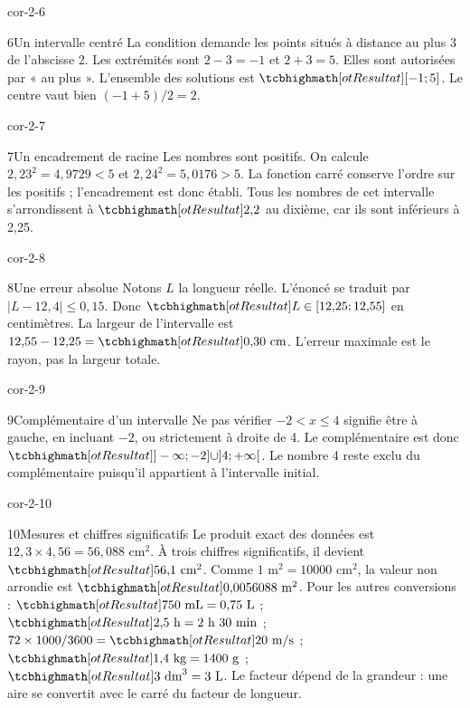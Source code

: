 \begin{blocLivre}{cor-2-6}
\begin{corrige}{6}{Un intervalle centré}
La condition demande les points situés à distance au plus 3 de l’abscisse 2. Les extrémités sont $2-3=-1$ et $2+3=5$. Elles sont autorisées par « au plus ». L’ensemble des solutions est $\res{[-1;5]}$. Le centre vaut bien $(-1+5)/2=2$.
\label{fig-cor-2-6}
\end{corrige}
\end{blocLivre}
\begin{blocLivre}{cor-2-7}
\begin{corrige}{7}{Un encadrement de racine}
Les nombres sont positifs. On calcule $2{,}23^2=4{,}9729<5$ et $2{,}24^2=5{,}0176>5$. La fonction carré conserve l’ordre sur les positifs ; l’encadrement est donc établi. Tous les nombres de cet intervalle s’arrondissent à $\res{2{,}2}$ au dixième, car ils sont inférieurs à 2,25.
\end{corrige}
\end{blocLivre}
\begin{blocLivre}{cor-2-8}
\begin{corrige}{8}{Une erreur absolue}
Notons $L$ la longueur réelle. L’énoncé se traduit par $|L-12{,}4|\le0{,}15$. Donc $\res{L\in[12{,}25;12{,}55]}$ en centimètres. La largeur de l’intervalle est $12{,}55-12{,}25=\res{0{,}30\text{ cm}}$. L’erreur maximale est le rayon, pas la largeur totale.
\end{corrige}
\end{blocLivre}
\begin{blocLivre}{cor-2-9}
\begin{corrige}{9}{Complémentaire d’un intervalle}
Ne pas vérifier $-2<x\le4$ signifie être à gauche, en incluant $-2$, ou strictement à droite de 4. Le complémentaire est donc $\res{]-\infty;-2]\cup]4;+\infty[}$. Le nombre 4 reste exclu du complémentaire puisqu’il appartient à l’intervalle initial.
\end{corrige}
\end{blocLivre}
\begin{blocLivre}{cor-2-10}
\begin{corrige}{10}{Mesures et chiffres significatifs}
Le produit exact des données est $12{,}3\times4{,}56=56{,}088$ cm$^2$. À trois chiffres significatifs, il devient $\res{56{,}1\text{ cm}^2}$. Comme $1\text{ m}^2=10000\text{ cm}^2$, la valeur non arrondie est $\res{0{,}0056088\text{ m}^2}$. Pour les autres conversions : $\res{750\text{ mL}=0{,}75\text{ L}}$ ; $\res{2{,}5\text{ h}=2\text{ h }30\text{ min}}$ ; $72\times1000/3600=\res{20\text{ m/s}}$ ; $\res{1{,}4\text{ kg}=1400\text{ g}}$ ; $\res{3\text{ dm}^3=3\text{ L}}$. Le facteur dépend de la grandeur : une aire se convertit avec le carré du facteur de longueur.
\end{corrige}
\end{blocLivre}
